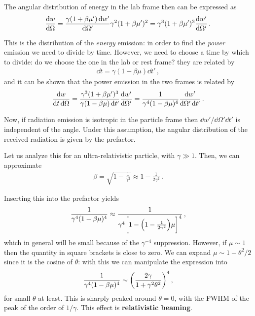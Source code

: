 \documentclass[main.tex]{subfiles}
\begin{document}
The angular distribution of energy in the lab frame then can be expressed as 
%
\begin{align}
\dv{w}{\Omega } = \frac{\gamma (1+ \beta \mu ') \dd{w'}}{ \dd{\Omega '}} \gamma^2 (1 + \beta \mu ')^2
= \gamma^3 (1 + \beta \mu ')^3  \dv{w'}{\Omega '}
\,.
\end{align}

This is the distribution of the \emph{energy} emission: in order to find the \emph{power} emission we need to divide by time. However, we need to choose a time by which to divide: do we choose the one in the lab or rest frame? they are related by 
%
\begin{align}
\dd{t} = \gamma (1 - \beta \mu ) \dd{t}'
\,,
\end{align}
%
and it can be shown that the power emission in the two frames is related by 
%
\begin{align}
\frac{ \dd{w}}{ \dd{t} \dd{\Omega }}
= \frac{\gamma^3(1+ \beta \mu ')^3}{\gamma (1 - \beta \mu ) \dd{t'}} \dv{w'}{\Omega '}
= \frac{1}{\gamma^{4} (1- \beta \mu )^{4}} \frac{ \dd{w'}}{ \dd{\Omega '} \dd{t'}} 
\,.
\end{align}

Now, if radiation emission is isotropic in the particle frame then \(\dd{w'} / \dd{\Omega '}  \dd{t'}\) is independent of the angle. 
Under this assumption, the angular distribution of the received radiation is given by the prefactor. 

Let us analyze this for an ultra-relativistic particle, with \(\gamma \gg 1\).  Then, we can approximate 
%
\begin{align}
\beta = \sqrt{1 - \frac{1}{\gamma^2}} \approx 1 - \frac{1}{2 \gamma^2}
\,.
\end{align}

Inserting this into the prefactor yields 
%
\begin{align}
\frac{1}{\gamma^{4} (1 - \beta \mu )^{4}}
\approx \frac{1}{\gamma^{4} \qty[1 - \qty(1 - \frac{1}{2 \gamma^2}) \mu ]^{4}}
\,,
\end{align}
%
which in general will be small because of the \(\gamma^{-4}\) suppression. However, if \(\mu \sim 1\) then the quantity in square brackets is close to zero. We can expand \(\mu \sim 1 - \theta^2 /2\) since it is the cosine of \(\theta \): with this we can manipulate the expression into 
%
\begin{align}
\frac{1}{\gamma^{4} (1 - \beta \mu )^{4}} \sim \qty(\frac{2 \gamma }{1 + \gamma^2 \theta^2})^{4}
\,,
\end{align}
%
for small \(\theta \) at least. This is sharply peaked around \(\theta = 0\), with the FWHM of the peak of the order of \(1/\gamma \). 
This effect is \textbf{relativistic beaming}. 
\end{document}
